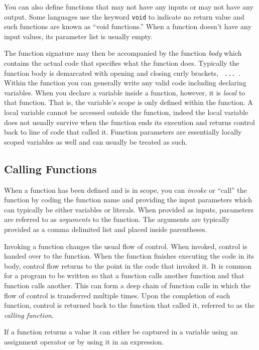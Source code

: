 You can also define functions that may not have any inputs or may not
have any output.  Some languages use the keyword \texttt{void} 
to indicate no return value and such functions are known as ``void 
functions.''  When a function doesn't have any input values, its parameter
list is usually empty.

The function signature may then be accompanied by the function \emph{body}
which contains the actual code that specifies what the function does.  
Typically the function body is demarcated with opening and closing curly
brackets, \texttt{{ ... }}.  Within the function you can generally
write any valid code including declaring variables.  When you declare a 
variable inside a function, however, it is \emph{local} to that function.
That is, the variable's scope is only defined within the function.  A local
variable cannot be accessed outside the function, indeed the local
variable does not usually survive when the function ends its
execution and returns control back to line of code that called it. 
Function parameters are essentially locally scoped variables as well 
and can usually be treated as such.

\subsection{Calling Functions}

When a function has been defined and is in scope, you can \emph{invoke}
or ``call'' the function by coding the function name and providing the input
parameters which can typically be either variables or literals.  When
provided as inputs, parameters are referred to as \emph{arguments}
to the function.  The arguments are typically provided as a comma delimited
list and placed inside parentheses.  

Invoking a function changes the usual flow of control.  When invoked, control
is handed over to the function.  When the function finishes executing the
code in its body, control flow returns to the point in the code that invoked it.
It is common for a program to be written so that a function calls another function
and that function calls another.  This can form a deep chain of function calls in 
which the flow of control is transferred multiple times.  Upon the completion
of each function, control is returned back to the function that called it, 
referred to as the \emph{calling function}.

If a function returns a value it can either be captured in a variable using an
assignment operator or by using it in an expression.  

